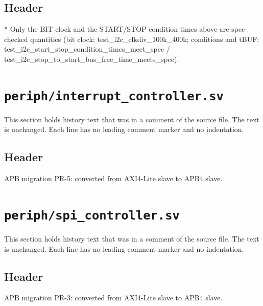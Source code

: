\begin{record}

\subsection*{Header}

\begin{textblock}
  * Only the BIT clock and the START/STOP condition times above are spec-checked quantities (bit
    clock: test_i2c_clkdiv_100k_400k; conditions and tBUF:
    test_i2c_start_stop_condition_times_meet_spec / test_i2c_stop_to_start_bus_free_time_meets_spec).
\end{textblock}

\end{record}

\section{\texttt{periph/interrupt\_controller.sv}}\label{cr:mod:interrupt-controller}

This section holds history text that was in a comment of the source file. The text is unchanged. Each line has no leading comment marker and no indentation.

\begin{record}

\subsection*{Header}

\begin{textblock}
APB migration PR-5: converted from AXI4-Lite slave to APB4 slave.
\end{textblock}

\end{record}

\section{\texttt{periph/spi\_controller.sv}}\label{cr:mod:spi-controller}

This section holds history text that was in a comment of the source file. The text is unchanged. Each line has no leading comment marker and no indentation.

\begin{record}

\subsection*{Header}

\begin{textblock}
APB migration PR-3: converted from AXI4-Lite slave to APB4 slave.
\end{textblock}

\end{record}

